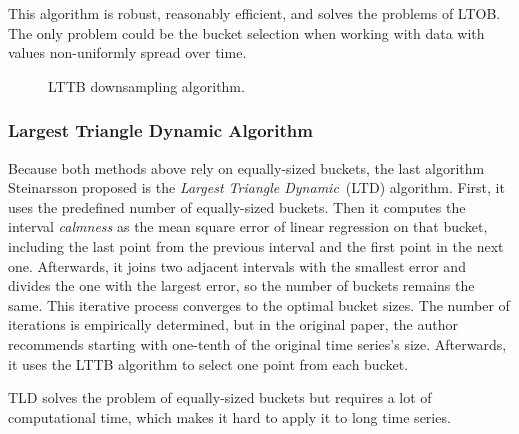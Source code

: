 This algorithm is robust, reasonably efficient, and solves the problems of LTOB. The only problem could be the bucket selection when working with data with values non-uniformly spread over time.

\begin{figure}[h]
    \centering
    
    \caption{LTTB downsampling algorithm.}
    \label{fig:lttb}
\end{figure}

\subsubsection{Largest Triangle Dynamic Algorithm}
Because both methods above rely on equally-sized buckets, the last algorithm Steinarsson proposed is the \textit{Largest Triangle Dynamic}~(LTD) algorithm. First, it uses the predefined number of equally-sized buckets. Then it computes the interval \textit{calmness} as the mean square error of linear regression on that bucket, including the last point from the previous interval and the first point in the next one. Afterwards, it joins two adjacent intervals with the smallest error and divides the one with the largest error, so the number of buckets remains the same. This iterative process converges to the optimal bucket sizes. The number of iterations is empirically determined, but in the original paper, the author recommends starting with one-tenth of the original time series's size. Afterwards, it uses the LTTB algorithm to select one point from each bucket.

TLD solves the problem of equally-sized buckets but requires a lot of computational time, which makes it hard to apply it to long time series.


